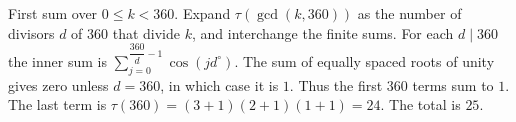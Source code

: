 First sum over $0\le k<360$. Expand $\tau(\gcd(k,360))$ as the number of divisors $d$ of $360$ that divide $k$, and interchange the finite sums. For each $d\mid360$ the inner sum is $\sum_{j=0}^{\dfrac{360}{d} - 1} \cos (jd^\circ)$. The sum of equally spaced roots of unity gives zero unless $d=360$, in which case it is $1$. Thus the first $360$ terms sum to $1$. The last term is $\tau(360)=(3+1)(2+1)(1+1)=24$. The total is $\boxed{25}$.
